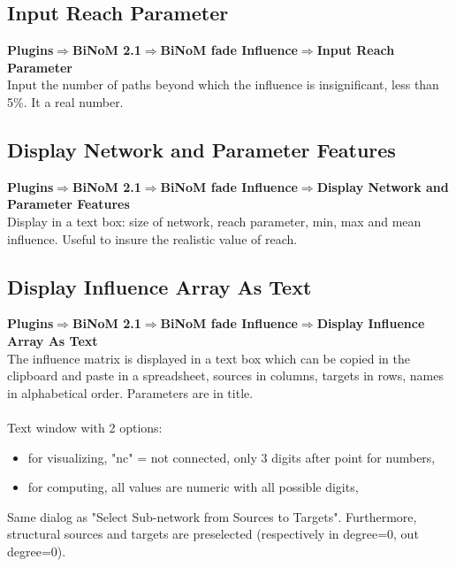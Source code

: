 \subsection{Input Reach Parameter}
\textbf{Plugins$\Rightarrow$BiNoM 2.1$\Rightarrow$BiNoM fade Influence$\Rightarrow$Input Reach Parameter}\\
Input the number of paths beyond which the influence is insignificant, less than 5\%. It a real number.

\subsection{Display Network and Parameter Features}
\textbf{Plugins$\Rightarrow$BiNoM 2.1$\Rightarrow$BiNoM fade Influence$\Rightarrow$Display Network and Parameter Features}\\
Display in a text box: size of network, reach parameter, min, max and mean influence. Useful to insure the realistic value of reach.

\subsection{Display Influence Array As Text}
\textbf{Plugins$\Rightarrow$BiNoM 2.1$\Rightarrow$BiNoM fade Influence$\Rightarrow$Display Influence Array As Text}\\
The influence matrix is displayed in a text box which can be copied in the clipboard and paste in a spreadsheet, sources in columns, targets in rows, names in alphabetical order. Parameters are in title.\\\\
Text window with 2 options: 
\begin{itemize}
\item for visualizing, "nc" = not connected, only 3 digits after point for numbers,
\item for computing,  all values are numeric with all possible digits,
\end{itemize}
Same dialog as "Select Sub-network from Sources to Targets". Furthermore, structural sources and targets are preselected (respectively in degree=0, out degree=0).


